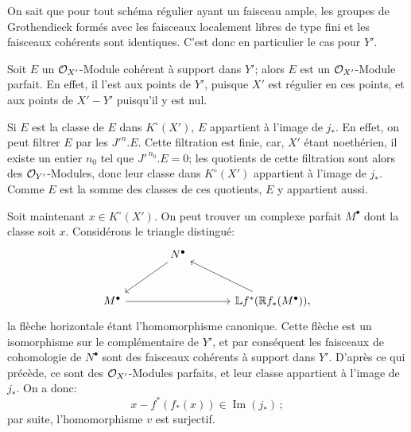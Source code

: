 On
sait que pour tout schéma régulier ayant un faisceau ample, les groupes de Grothendieck formés avec les faisceaux localement libres de type fini et les faisceaux cohérents sont identiques. C'est donc en particulier le cas pour \(Y'\).

Soit \(E\) un \(\cO_{X'}\)-Module cohérent à support dans \(Y'\); alors \(E\) est un \(\cO_{X'}\)-Module parfait. En effet, il l'est aux points de \(Y'\), puisque \(X'\) est régulier en ces points, et aux points de \(X'-Y'\) puisqu'il y est nul.

Si \(E\) est la classe de \(E\) dans \(K^\circ(X')\), \(E\) appartient à l'image de \(j_*\). En effet, on peut filtrer \(E\) par les \(J'^n.E\). Cette filtration est finie, car, \(X'\) étant noethérien, il existe un entier \(n_0\) tel que \(J'^{\,n_0}.E=0\); les quotients de cette filtration sont alors des \(\cO_{Y'}\)-Modules, donc leur classe dans \(K^\circ(X')\) appartient à l'image de \(j_*\). Comme \(E\) est la somme des classes de ces quotients, \(E\) y appartient aussi.

Soit maintenant \(x\in K^\circ(X')\). On peut trouver un complexe parfait \(M^\bullet\) dont la classe soit \(x\). Considérons le triangle distingué:
\[
\begin{tikzcd}[column sep=large,row sep=large]
& N^\bullet \arrow[dl] &\\
M^\bullet \arrow[rr] && \mathbb Lf^*(\mathbb Rf_*(M^\bullet)) \arrow[ul] ,
\end{tikzcd}
\]
la flèche horizontale étant l'homomorphisme canonique. Cette flèche est un isomorphisme sur le complémentaire de \(Y'\), et par conséquent les faisceaux de cohomologie de \(N^\bullet\) sont des faisceaux cohérents à support dans \(Y'\). D'après ce qui précède, ce sont des \(\cO_{X'}\)-Modules parfaits, et leur classe appartient à l'image de \(j_*\). On a donc:
\[
x-f^*(f_*(x))\in\operatorname{Im}(j_*)\,;
\]
par suite, l'homomorphisme \(v\) est surjectif.



\providecommand{\Q}{\mathbb Q}
\providecommand{\bfP}{\mathbf P}
\providecommand{\gr}{\operatorname{gr}}
\providecommand{\Id}{\operatorname{Id}}
\providecommand{\Fil}{\operatorname{Fil}}
\providecommand{\Imf}{\operatorname{Im}}
\providecommand{\rank}{\operatorname{rank}}
\providecommand{\codim}{\operatorname{codim}}
\providecommand{\cJ}{\mathcal J}
\providecommand{\cI}{\mathcal I}
\providecommand{\cN}{\mathcal N}
\providecommand{\cE}{\mathcal E}
\providecommand{\cO}{\mathcal O}



